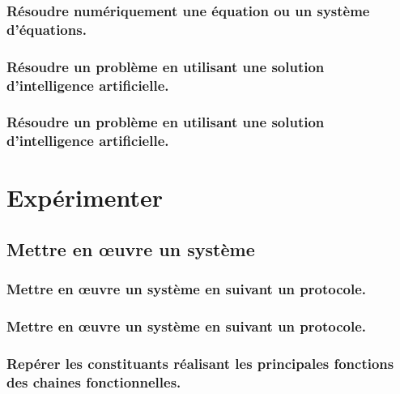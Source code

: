 \documentclass[10pt,fleqn]{book}
\newcommand{\repRel}{../..}
\newcommand{\repStyle}{\repRel/Style}
\newcommand{\td}{fichier_td}
\newcommand{\repExos}{\repRel/ExercicesCompetences}
\newcommand{\repExo}{dossier}
\begin{document}
\subsection{Résoudre numériquement une équation ou un système d'équations. } 

\renewcommand{\repExo}{\repExos/C3_ResolutionNumerique/C3_02_Euler/1021_Euler}
\renewcommand{\td}{1021_Euler}
\graphicspath{{\repStyle/png/}{\repExo/images/}}


\renewcommand{\repExo}{\repExos/C3_ResolutionNumerique/C3_02_Euler/1022_Euler}
\renewcommand{\td}{1022_Euler}
\graphicspath{{\repStyle/png/}{\repExo/images/}}


\renewcommand{\repExo}{\repExos/C3_ResolutionNumerique/C3_02_Euler/1023_Euler}
\renewcommand{\td}{1023_Euler}
\graphicspath{{\repStyle/png/}{\repExo/images/}}


\subsection{Résoudre un problème en utilisant une solution d'intelligence artificielle. } 

\subsection{Résoudre un problème en utilisant une solution d'intelligence artificielle. } 

\chapter{Expérimenter} 

\section{Mettre en œuvre un système} 

\subsection{Mettre en œuvre un système en suivant un protocole.} 

\subsection{Mettre en œuvre un système en suivant un protocole.} 

\subsection{Repérer les constituants réalisant les principales fonctions des chaines fonctionnelles.} 
\end{document}
